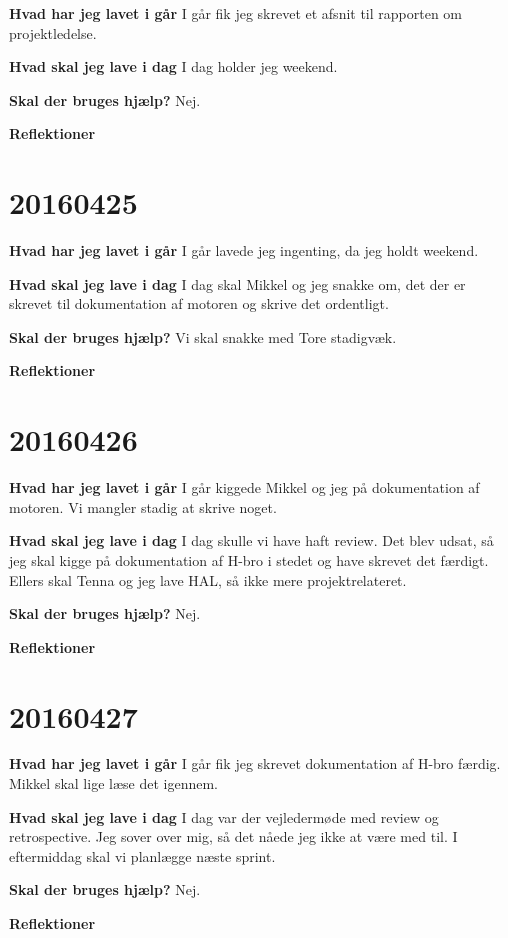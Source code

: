 \documentclass{article}
\begin{document}
	\textbf{Hvad har jeg lavet i går}
	I går fik jeg skrevet et afsnit til rapporten om projektledelse. 
	
	\textbf{Hvad skal jeg lave i dag}
	I dag holder jeg weekend. 
	
	\textbf{Skal der bruges hjælp?}
	Nej.  
	
	\textbf{Reflektioner}
	
	\section{20160425}
	
	\textbf{Hvad har jeg lavet i går}
	I går lavede jeg ingenting, da jeg holdt weekend. 
	
	\textbf{Hvad skal jeg lave i dag}
	I dag skal Mikkel og jeg snakke om, det der er skrevet til dokumentation af motoren og skrive det ordentligt. 
	
	\textbf{Skal der bruges hjælp?}
	Vi skal snakke med Tore stadigvæk. 
	
	\textbf{Reflektioner}
	
	\section{20160426}
	
	\textbf{Hvad har jeg lavet i går}
	I går kiggede Mikkel og jeg på dokumentation af motoren. Vi mangler stadig at skrive noget. 
	
	\textbf{Hvad skal jeg lave i dag}
	I dag skulle vi have haft review. Det blev udsat, så jeg skal kigge på dokumentation af H-bro i stedet og have skrevet det færdigt. Ellers skal Tenna og jeg lave HAL, så ikke mere projektrelateret. 
	
	\textbf{Skal der bruges hjælp?}
	Nej.  
	
	\textbf{Reflektioner}
	
	\section{20160427}
	
	\textbf{Hvad har jeg lavet i går}
	I går fik jeg skrevet dokumentation af H-bro færdig. Mikkel skal lige læse det igennem. 
	
	\textbf{Hvad skal jeg lave i dag}
	I dag var der vejledermøde med review og retrospective. Jeg sover over mig, så det nåede jeg ikke at være med til. I eftermiddag skal vi planlægge næste sprint. 
	
	\textbf{Skal der bruges hjælp?}
	Nej.  
	
	\textbf{Reflektioner}
	
\end{document}
